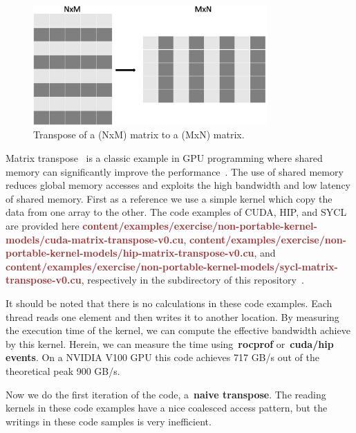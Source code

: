 \begin{figure}[htbp]
\centering\includegraphics[width=0.8\textwidth]{fig_problem/matrix_transpose_2d.jpg}
\caption{Transpose of a (NxM) matrix to a (MxN) matrix.}\label{fig:matrix_transpose}
\end{figure}


\par
Matrix transpose~\cite{matrix_transpose} is a classic example in GPU programming where shared memory can significantly improve the performance~\cite{matrix_transpose_efficient, matrix_transpose_advanced}.
The use of shared memory reduces global memory accesses and exploits the high bandwidth and low latency of shared memory.
First as a reference we use a simple kernel which copy the data from one array to the other.
The code examples of CUDA, HIP, and SYCL are provided here \textbf{\textcolor{brown}{content/examples/exercise/non-portable-kernel-models/cuda-matrix-transpose-v0.cu}}, \textbf{\textcolor{brown}{content/examples/exercise/non-portable-kernel-models/hip-matrix-transpose-v0.cu}}, and \textbf{\textcolor{brown}{content/examples/exercise/non-portable-kernel-models/sycl-matrix-transpose-v0.cu}}, respectively in the subdirectory of this repository~\cite{gpu-programming-examples}.



\par
It should be noted that there is no calculations in these code examples.
Each thread reads one element and then writes it to another location.
By measuring the execution time of the kernel, we can compute the effective bandwidth achieve by this kernel.
Herein, we can measure the time using~\textbf{rocprof} or~\textbf{cuda/hip events}.
On a NVIDIA V100 GPU this code achieves 717 GB/s out of the theoretical peak 900 GB/s.


\par
Now we do the first iteration of the code, a~\textbf{naive transpose}.
The reading kernels in these code examples have a nice coalesced access pattern, but the writings in these code samples is very inefficient.


